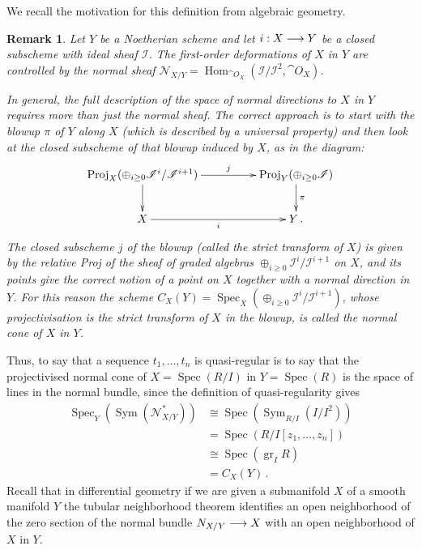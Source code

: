\documentclass[english,letter paper,12pt,leqno]{article}
\theoremstyle{example}
\newtheorem{remark}[theorem]{Remark}
\numberwithin{equation}{section}
\def\Hom{\operatorname{Hom}}
\DeclareMathOperator{\Spec}{Spec}
\begin{document}
We recall the motivation for this definition from algebraic geometry.

\begin{remark} Let $Y$ be a Noetherian scheme and let $i: X \longrightarrow Y$ be a closed subscheme with ideal sheaf $\mathscr{I}$. The first-order deformations of $X$ in $Y$ are controlled \cite[Theorem VI-29]{eisenbudharris} by the normal sheaf $\mathscr{N}_{X/Y} = \Hom_{\cat{O}_X}(\mathscr{I}/\mathscr{I}^2, \cat{O}_X)$.

In general, the full description of the space of normal directions to $X$ in $Y$ requires more than just the normal sheaf. The correct approach is to start with the blowup $\pi$ of $Y$ along $X$ (which is described by a universal property) and then look at the closed subscheme of that blowup induced by $X$, as in the diagram:
\[
\xymatrix@C+2pc{
\operatorname{Proj}_X( \oplus_{i \ge 0} \mathscr{I}^i/\mathscr{I}^{i+1} ) \ar[r]^-j\ar[d] & \operatorname{Proj}_Y( \oplus_{i \ge 0} \mathscr{I} ) \ar[d]^-{\pi}\\
X \ar[r]_-{i} & Y\,.
}
\]
The closed subscheme $j$ of the blowup (called the strict transform of $X$) is given by the relative Proj of the sheaf of graded algebras $\oplus_{i \ge 0} \mathscr{I}^i/\mathscr{I}^{i+1}$ on $X$, and its points give the correct notion of a point on $X$ together with a normal direction in $Y$. For this reason the scheme $C_X(Y) = \Spec_X( \oplus_{i \ge 0} \mathscr{I}^i / \mathscr{I}^{i+1} )$, whose projectivisation is the strict transform of $X$ in the blowup, is called the \emph{normal cone} of $X$ in $Y$.
\end{remark}

Thus, to say that a sequence $t_1,\ldots,t_n$ is quasi-regular is to say that the projectivised normal cone of $X = \Spec(R/I)$ in $Y = \Spec(R)$ is the space of lines in the normal bundle, since the definition of quasi-regularity gives 
\begin{align*}
\Spec_{Y}( \operatorname{Sym}( \mathscr{N}^*_{X/Y} ) ) &\cong \Spec( \operatorname{Sym}_{R/I}( I/I^2 ) )\\
&= \Spec( R/I[z_1,\ldots,z_n] )\\
&\cong \Spec( \operatorname{gr}_ I R)\\
&= C_X(Y)\,.
\end{align*}
Recall that in differential geometry if we are given a submanifold $X$ of a smooth manifold $Y$ the tubular neighborhood theorem \cite[\S 4.5]{hirsch} identifies an open neighborhood of the zero section of the normal bundle $N_{X/Y} \longrightarrow X$ with an open neighborhood of $X$ in $Y$. 
\end{document}
